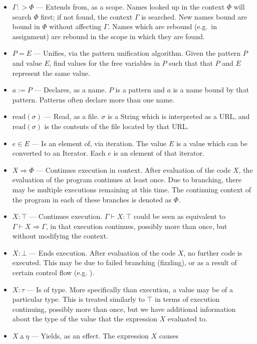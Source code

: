 \begin{itemize}
    \item $\Gamma :> \Phi$ --- Extends from, as a scope. Names looked up in the
    context $\Phi$ will search $\Phi$ first; if not found, the context $\Gamma$
    is searched. New names bound are bound in $\Phi$ without affecting $\Gamma$.
    Names which are rebound (e.g.\ in assignment) are rebound in the scope in
    which they are found.
    \item $P = E$ --- Unifies, via the pattern unification algorithm. Given the
    pattern $P$ and value $E$, find values for the free variables in $P$ such that
    that $P$ and $E$ represent the same value.
    \item $a := P$ --- Declares, as a name. $P$ is a pattern and $a$ is a name
    bound by that pattern. Patterns often declare more than one name.
    \item $\text{read}(\sigma)$ --- Read, as a file. $\sigma$ is a String which is interpreted
    as a URL, and $\text{read}(\sigma)$ is the contents of the file located by that URL.
    \item $e \in E$ --- Is an element of, via iteration. The value $E$ is a value
    which can be converted to an Iterator. Each $e$ is an element of that iterator.
    \item $X \Rightarrow \Phi$ --- Continues execution in context. After evaluation
    of the code $X$, the evaluation of the program continues at least once. Due to
    branching, there may be multiple executions remaining at this time. The
    continuing context of the program in each of these branches is denoted as
    $\Phi$.
    \item $X : \top$ --- Continues execution. $\Gamma\vdash X : \top$ could be
    seen as equivalent to $\Gamma \vdash X \Rightarrow \Gamma$, in that execution
    continues, possibly more than once, but without modifying the context.
    \item $X : \bot$ --- Ends execution. After evaluation of the code $X$,
    no further code is executed. This may be due to failed branching (fizzling),
    or as a result of certain control flow (e.g. ).
    \item $X : \tau$ --- Is of type. More specifically than execution, a value may
    be of a particular type. This is treated similarly to $\top$ in terms of
    execution continuing, possibly more than once, but we have additional
    information about the type of the value that the expression $X$ evaluated to.
    \item $X \vartriangle \eta$ --- Yields, as an effect. The expression $X$ causes

\end{itemize}
